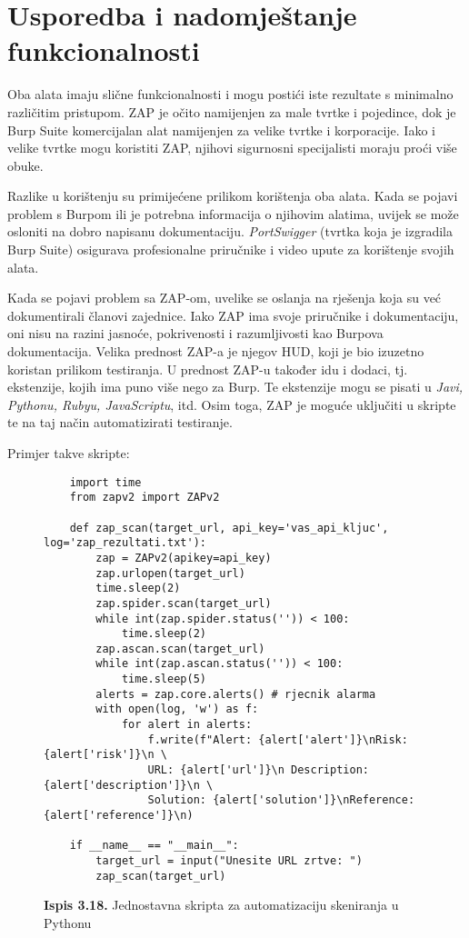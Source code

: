 \chapter{Usporedba i nadomještanje funkcionalnosti}
Oba alata imaju slične funkcionalnosti i mogu postići iste rezultate s minimalno različitim pristupom. 
ZAP je očito namijenjen za male tvrtke i pojedince, dok je Burp Suite komercijalan alat namijenjen za velike tvrtke i korporacije. 
Iako i velike tvrtke mogu koristiti ZAP, njihovi sigurnosni specijalisti moraju proći više obuke.

Razlike u korištenju su primijećene prilikom korištenja oba alata. 
Kada se pojavi problem s Burpom ili je potrebna informacija o njihovim alatima, uvijek se može osloniti na dobro napisanu dokumentaciju. 
\textit{PortSwigger} (tvrtka koja je izgradila Burp Suite) osigurava profesionalne priručnike i video upute za korištenje svojih alata.

Kada se pojavi problem sa ZAP-om, uvelike se oslanja na rješenja koja su već dokumentirali članovi zajednice. 
Iako ZAP ima svoje priručnike i dokumentaciju, oni nisu na razini jasnoće, pokrivenosti i razumljivosti kao Burpova dokumentacija. 
Velika prednost ZAP-a je njegov HUD, koji je bio izuzetno koristan prilikom testiranja. 
U prednost ZAP-u također idu i dodaci, tj. ekstenzije, kojih ima puno više nego za Burp. 
Te ekstenzije mogu se pisati u \textit{Javi, Pythonu, Rubyu, JavaScriptu}, itd. 
Osim toga, ZAP je moguće uključiti u skripte te na taj način automatizirati testiranje.

Primjer takve skripte:

\captionsetup[figure]{labelformat=empty, labelsep=none}

\begin{figure}[H]
    \begin{verbatim}
    import time
    from zapv2 import ZAPv2

    def zap_scan(target_url, api_key='vas_api_kljuc', log='zap_rezultati.txt'):
        zap = ZAPv2(apikey=api_key)
        zap.urlopen(target_url)
        time.sleep(2)
        zap.spider.scan(target_url)
        while int(zap.spider.status('')) < 100:
            time.sleep(2)
        zap.ascan.scan(target_url)
        while int(zap.ascan.status('')) < 100:
            time.sleep(5)
        alerts = zap.core.alerts() # rjecnik alarma
        with open(log, 'w') as f:
            for alert in alerts:
                f.write(f"Alert: {alert['alert']}\nRisk: {alert['risk']}\n \
                URL: {alert['url']}\n Description: {alert['description']}\n \
                Solution: {alert['solution']}\nReference: {alert['reference']}\n)

    if __name__ == "__main__":
        target_url = input("Unesite URL zrtve: ")
        zap_scan(target_url)
    \end{verbatim}
    \captionsetup{labelformat=empty} %
    \caption{\textbf{Ispis 3.18.} Jednostavna skripta za automatizaciju skeniranja u Pythonu\cite{zap_script}}
    \label{inp:script}
\end{figure}

